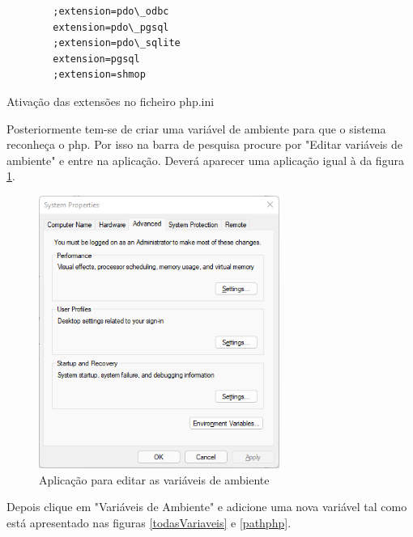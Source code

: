 \documentclass[11pt, twoside]{report}
\begin{document}
		\begin{listing}[H]
		\begin{verbatim}
		;extension=pdo\_odbc
		extension=pdo\_pgsql
		;extension=pdo\_sqlite
		extension=pgsql
		;extension=shmop
		\end{verbatim}
		\caption{Ativação das extensões no ficheiro php.ini}
		\label{php.ini}
		
	\end{listing}
	
	Posteriormente tem-se de criar uma variável de ambiente para que o sistema reconheça o php. Por isso na barra de pesquisa procure por "Editar variáveis de ambiente" e entre na aplicação. Deverá aparecer uma aplicação igual à da figura \ref{variveis}. 
	
	\begin{figure}[H] 
		\centering 
		\includegraphics[width=0.7\textwidth,height=0.7\textheight,keepaspectratio]{images/editar}
		\caption{Aplicação para editar as variáveis de ambiente}
		\label{variveis}
	\end{figure}

	Depois clique em "Variáveis de Ambiente" e adicione uma nova variável tal como está apresentado nas figuras \ref{todasVariaveis} e \ref{pathphp}.
	
\end{document}
